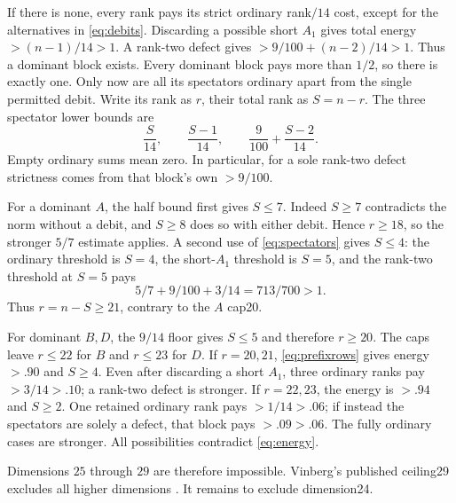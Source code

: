 \documentclass[11pt]{article}
\theoremstyle{remark}
\begin{document}
If there is none, every rank pays its strict ordinary rank$/14$
cost, except for the alternatives in \eqref{eq:debits}.
Discarding a possible short \(A_1\) gives total energy
\(>(n-1)/14>1\). A rank-two defect gives
\(>9/100+(n-2)/14>1\). Thus a dominant block exists.
Every dominant block pays more than \(1/2\), so there is exactly
one. Only now are all its spectators ordinary apart from the
single permitted debit. Write its rank as \(r\), their total rank
as \(S=n-r\). The three spectator lower bounds are
\begin{equation}\label{eq:spectators}
 \frac S{14},\qquad \frac{S-1}{14},\qquad
 \frac9{100}+\frac{S-2}{14}.
\end{equation}
Empty ordinary sums mean zero. In particular, for a sole rank-two
defect strictness comes from that block's own \(>9/100\).

For a dominant \(A\), the half bound first gives \(S\le7\).
Indeed \(S\ge7\) contradicts the norm without a debit, and
\(S\ge8\) does so with either debit. Hence \(r\ge18\), so the
stronger \(5/7\) estimate applies. A second use of
\eqref{eq:spectators} gives \(S\le4\): the ordinary threshold
is \(S=4\), the short-\(A_1\) threshold is \(S=5\), and the
rank-two threshold at \(S=5\) pays
\[
 5/7+9/100+3/14=713/700>1.
\]
Thus \(r=n-S\ge21\), contrary to the \(A\) cap20.

For dominant \(B,D\), the \(9/14\) floor gives \(S\le5\) and
therefore \(r\ge20\). The caps leave \(r\le22\) for \(B\) and
\(r\le23\) for \(D\). If \(r=20,21\), \eqref{eq:prefixrows}
gives energy \(>.90\) and \(S\ge4\). Even after discarding a short
\(A_1\), three ordinary ranks pay \(>3/14>.10\); a rank-two
defect is stronger. If \(r=22,23\), the energy is \(>.94\) and
\(S\ge2\). One retained ordinary rank pays \(>1/14>.06\);
if instead the spectators are solely a defect, that block pays
\(>.09>.06\). The fully ordinary cases are stronger.
All possibilities contradict \eqref{eq:energy}.

Dimensions \(25\) through \(29\) are therefore impossible.
Vinberg's published ceiling29 excludes all higher dimensions
\cite{Vin84}. It remains to exclude dimension24.
\end{document}
